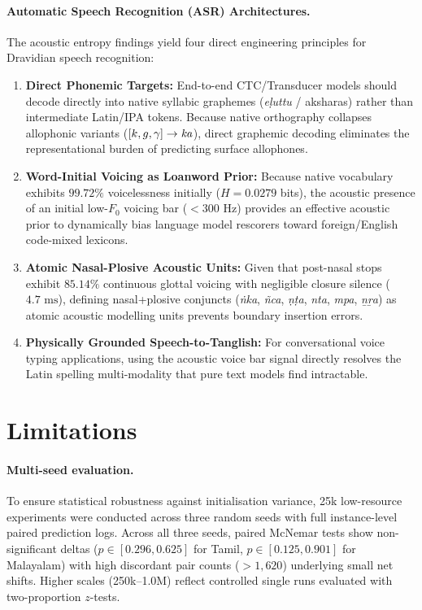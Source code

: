 \documentclass[11pt]{article}
\begin{document}
\paragraph{Automatic Speech Recognition (ASR) Architectures.}
The acoustic entropy findings yield four direct engineering principles for Dravidian speech recognition:
\begin{enumerate}
    \item \textbf{Direct Phonemic Targets:} End-to-end CTC/Transducer models should decode directly into native syllabic graphemes (\textit{e\d{l}uttu} / aksharas) rather than intermediate Latin/IPA tokens. Because native orthography collapses allophonic variants ($[k, g, \gamma] \to \text{\textit{ka}}$), direct graphemic decoding eliminates the representational burden of predicting surface allophones.
    \item \textbf{Word-Initial Voicing as Loanword Prior:} Because native vocabulary exhibits $99.72\%$ voicelessness initially ($H = 0.0279$ bits), the acoustic presence of an initial low-$F_0$ voicing bar ($<300\text{ Hz}$) provides an effective acoustic prior to dynamically bias language model rescorers toward foreign/English code-mixed lexicons.
    \item \textbf{Atomic Nasal-Plosive Acoustic Units:} Given that post-nasal stops exhibit $85.14\%$ continuous glottal voicing with negligible closure silence ($4.7\text{ ms}$), defining nasal+plosive conjuncts (\textit{\.{n}ka}, \textit{\~{n}ca}, \textit{\d{n}\d{t}a}, \textit{nta}, \textit{mpa}, \textit{\b{n}\b{r}a}) as atomic acoustic modelling units prevents boundary insertion errors.
    \item \textbf{Physically Grounded Speech-to-Tanglish:} For conversational voice typing applications, using the acoustic voice bar signal directly resolves the Latin spelling multi-modality that pure text models find intractable.
\end{enumerate}

\section{Limitations}
\label{sec:limits}

\paragraph{Multi-seed evaluation.} To ensure statistical robustness against initialisation variance, 25k low-resource experiments were conducted across three random seeds with full instance-level paired prediction logs. Across all three seeds, paired McNemar tests show non-significant deltas ($p \in [0.296, 0.625]$ for Tamil, $p \in [0.125, 0.901]$ for Malayalam) with high discordant pair counts ($>1{,}620$) underlying small net shifts. Higher scales (250k--1.0M) reflect controlled single runs evaluated with two-proportion $z$-tests.
\end{document}
